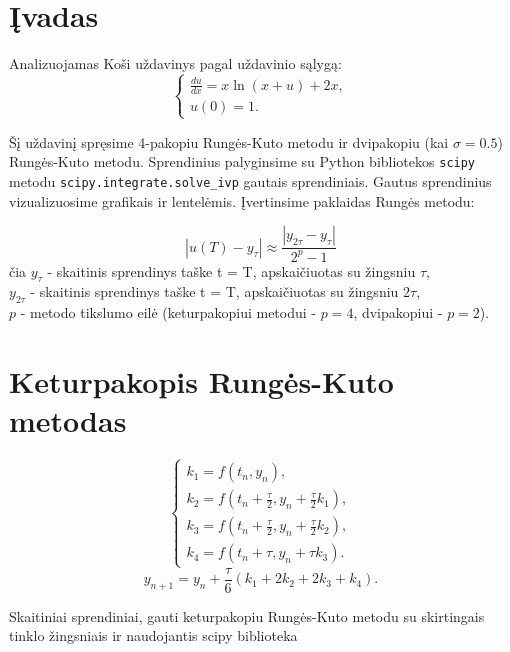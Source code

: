 \documentclass[]{VUMIFTemplateClass}
\begin{document}
\onehalfspacing


\tableofcontents
\onehalfspacing

\section{Įvadas}
Analizuojamas Koši uždavinys pagal uždavinio sąlygą:
\begin{equation}
    \begin{cases}
        \frac{du}{dx} = x \ln(x + u) + 2x,\\
        u(0) = 1.
    \end{cases}
\end{equation}

Šį uždavinį spręsime 4-pakopiu Rungės-Kuto metodu ir dvipakopiu (kai $\sigma = 0.5$) Rungės-Kuto metodu. Sprendinius palyginsime su Python bibliotekos \texttt{scipy} metodu \texttt{scipy.integrate.solve\_ivp} gautais sprendiniais. Gautus sprendinius vizualizuosime grafikais ir lentelėmis. Įvertinsime paklaidas Rungės metodu:

\[ |u(T) - y_{\tau}| \approx \frac{|y_{2 \tau} - y_{\tau}|}{2^p - 1} \]
čia $y_{\tau}$ - skaitinis sprendinys taške t = T, apskaičiuotas su žingsniu $\tau$,\\
$y_{2 \tau}$ - skaitinis sprendinys taške t = T, apskaičiuotas su žingsniu $2 \tau$,\\
$p$ - metodo tikslumo eilė (keturpakopiui metodui - $p = 4$, dvipakopiui - $p = 2$).

\section{Keturpakopis Rungės-Kuto metodas}
\begin{equation}
    \begin{cases}
        k_1 = f(t_n, y_n),\\
        k_2 = f(t_n + \frac{\tau}{2}, y_n + \frac{\tau}{2} k_1),\\
        k_3 = f(t_n + \frac{\tau}{2}, y_n + \frac{\tau}{2} k_2),\\
        k_4 = f(t_n + \tau, y_n + \tau k_3).
    \end{cases}
\end{equation}
\[ y_{n+1} = y_n + \frac{\tau}{6}(k_1 + 2k_2 + 2k_3 + k_4). \]

\begin{table}[H]
    \begin{center}
        
    \end{center}
    \label{rt4tbl}
    \caption{Skaitiniai sprendiniai, gauti keturpakopiu Rungės-Kuto metodu su skirtingais tinklo žingsniais ir naudojantis scipy biblioteka}
\end{table}
\end{document}
